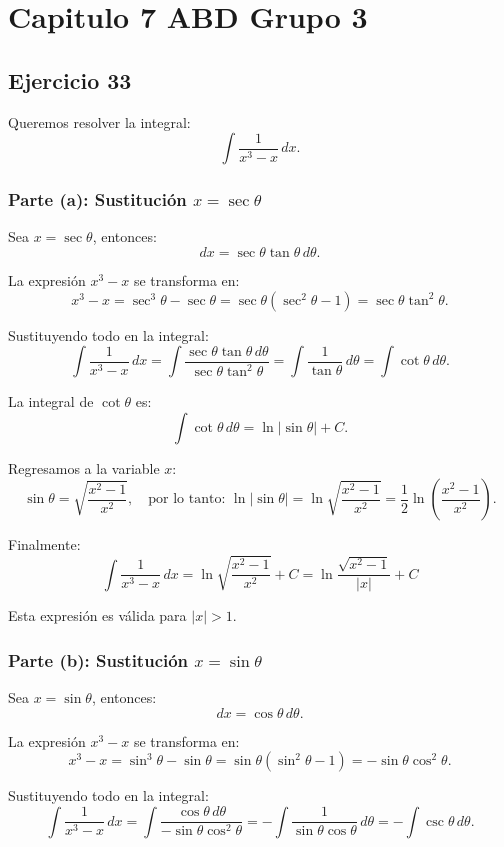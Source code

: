 \chapter*{Capitulo 7 ABD Grupo 3}
\section*{Ejercicio 33}

Queremos resolver la integral:
\[
\int \frac{1}{x^3 - x} \, dx.
\]

\subsection*{Parte (a): Sustitución \( x = \sec\theta \)}

Sea \( x = \sec\theta \), entonces:
\[
dx = \sec\theta \tan\theta \, d\theta.
\]

La expresión \( x^3 - x \) se transforma en:
\[
x^3 - x = \sec^3\theta - \sec\theta = \sec\theta (\sec^2\theta - 1) = \sec\theta \tan^2\theta.
\]

Sustituyendo todo en la integral:
\[
\int \frac{1}{x^3 - x} \, dx = \int \frac{\sec\theta \tan\theta \, d\theta}{\sec\theta \tan^2\theta} = \int \frac{1}{\tan\theta} \, d\theta = \int \cot\theta \, d\theta.
\]

La integral de \( \cot\theta \) es:
\[
\int \cot\theta \, d\theta = \ln|\sin\theta| + C.
\]

Regresamos a la variable \( x \):
\[
\sin\theta = \sqrt{\frac{x^2 - 1}{x^2}}, \quad \text{por lo tanto: } \ln|\sin\theta| = \ln\sqrt{\frac{x^2 - 1}{x^2}} = \frac{1}{2} \ln\left(\frac{x^2 - 1}{x^2}\right).
\]

Finalmente:
\[\boxed{
\int \frac{1}{x^3 - x} \, dx = \ln\sqrt{\frac{x^2 - 1}{x^2}} + C = \ln\frac{\sqrt{x^2 - 1}}{|x|} + C}
\]

Esta expresión es válida para \( |x| > 1 \).

\subsection*{Parte (b): Sustitución \( x = \sin\theta \)}

Sea \( x = \sin\theta \), entonces:
\[
dx = \cos\theta \, d\theta.
\]

La expresión \( x^3 - x \) se transforma en:
\[
x^3 - x = \sin^3\theta - \sin\theta = \sin\theta (\sin^2\theta - 1) = -\sin\theta \cos^2\theta.
\]

Sustituyendo todo en la integral:
\[
\int \frac{1}{x^3 - x} \, dx = \int \frac{\cos\theta \, d\theta}{-\sin\theta \cos^2\theta} = -\int \frac{1}{\sin\theta \cos\theta} \, d\theta = -\int \csc\theta \, d\theta.
\]


